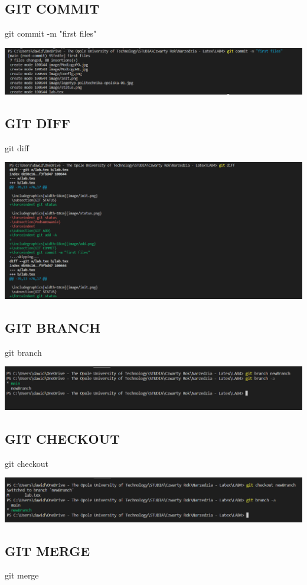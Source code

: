 \documentclass{article} %
\newcommand{\forceindent}{\leavevmode{\parindent=1cm\indent}} %
\begin{document}
\subsection{GIT COMMIT}
\forceindent git commit -m "first files"

\includegraphics[width=18cm]{image/commit.png}
\subsection{GIT DIFF}
\forceindent git diff

\includegraphics[width=18cm]{image/diff.png}
\subsection{GIT BRANCH}
\forceindent git branch

\includegraphics[width=18cm]{image/branch.png}
\subsection{GIT CHECKOUT}
\forceindent git checkout

\includegraphics[width=18cm]{image/checkout.png}
\subsection{GIT MERGE}
\forceindent git merge
\end{document}
